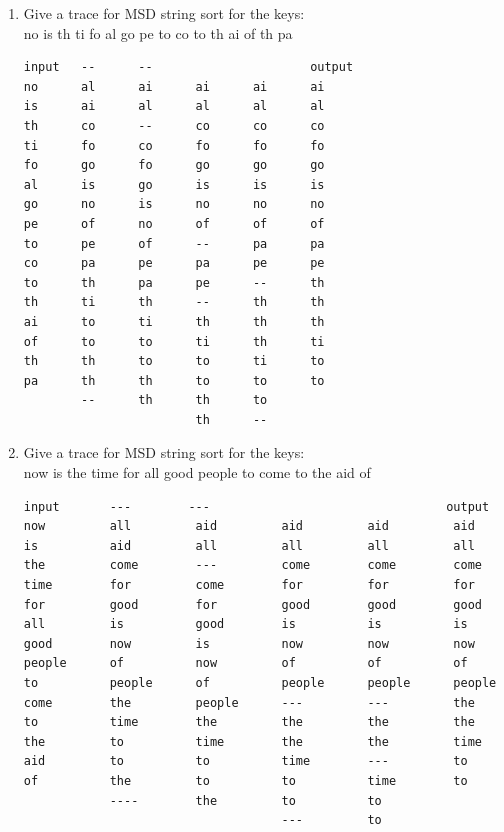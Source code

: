 \documentclass[11pt,fleqn]{article}
\begin{document}
\begin{enumerate}
\begin{enumerate}
		\item
Give a trace for MSD string sort for the keys: \\
no is th ti fo al go pe to co to th ai of th pa
\begin{Verbatim}
input   --      --                      output
no      al      ai      ai      ai      ai       
is      ai      al      al      al      al
th      co      --      co      co      co
ti      fo      co      fo      fo      fo
fo      go      fo      go      go      go
al      is      go      is      is      is
go      no      is      no      no      no
pe      of      no      of      of      of
to      pe      of      --      pa      pa
co      pa      pe      pa      pe      pe
to      th      pa      pe      --      th
th      ti      th      --      th      th
ai      to      ti      th      th      th
of      to      to      ti      th      ti
th      th      to      to      ti      to
pa      th      th      to      to      to
        --      th      th      to
                        th      --
\end{Verbatim}

		\item
Give a trace for MSD string sort for the keys: \\
now is the time for all good people to come to the aid of
\begin{Verbatim}
input       ---        ---                                 output            
now         all         aid         aid         aid         aid         
is          aid         all         all         all         all
the         come        ---         come        come        come
time        for         come        for         for         for
for         good        for         good        good        good
all         is          good        is          is          is
good        now         is          now         now         now
people      of          now         of          of          of
to          people      of          people      people      people
come        the         people      ---         ---         the
to          time        the         the         the         the
the         to          time        the         the         time
aid         to          to          time        ---         to
of          the         to          to          time        to
            ----        the         to          to
                                    ---         to
\end{Verbatim}
	\end{enumerate}
	

\end{enumerate}
\end{document}
